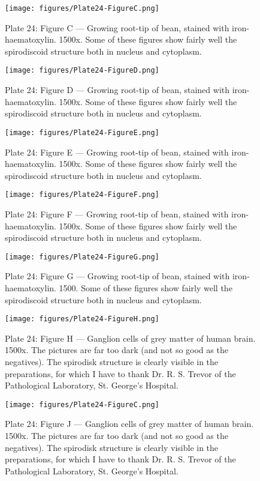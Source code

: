 \documentclass[a4paper, 12pt, oneside]{article}
\begin{document}
\clearpage
\begin{figure}[b]
\centering
\texttt{[image: figures/Plate24-FigureC.png]}
\caption{\small Plate 24: Figure C --- Growing root-tip of bean, stained with iron-haematoxylin. 1500x. Some of these figures show fairly well the spirodiscoid structure both in nucleus and cytoplasm.}
\end{figure}
\clearpage
\begin{figure}[b]
\centering
\texttt{[image: figures/Plate24-FigureD.png]}
\caption{\small Plate 24: Figure D --- Growing root-tip of bean, stained with iron-haematoxylin. 1500x. Some of these figures show fairly well the spirodiscoid structure both in nucleus and cytoplasm.}
\end{figure}
\clearpage
\begin{figure}[b]
\centering
\texttt{[image: figures/Plate24-FigureE.png]}
\caption{\small Plate 24: Figure E --- Growing root-tip of bean, stained with iron-haematoxylin. 1500x. Some of these figures show fairly well the spirodiscoid structure both in nucleus and cytoplasm.}
\end{figure}
\clearpage
\begin{figure}[b]
\centering
\texttt{[image: figures/Plate24-FigureF.png]}
\caption{\small Plate 24: Figure F --- Growing root-tip of bean, stained with iron-haematoxylin. 1500x. Some of these figures show fairly well the spirodiscoid structure both in nucleus and cytoplasm.}
\end{figure}
\clearpage
\begin{figure}[b]
\centering
\texttt{[image: figures/Plate24-FigureG.png]}
\caption{\small Plate 24: Figure G --- Growing root-tip of bean, stained with iron-haematoxylin. 1500. Some of these figures show fairly well the spirodiscoid structure both in nucleus and cytoplasm.}
\end{figure}
\clearpage
\begin{figure}[b]
\centering
\texttt{[image: figures/Plate24-FigureH.png]}
\caption{\small Plate 24: Figure H --- Ganglion cells of grey matter of human brain. 1500x. The pictures are far too dark (and not so good as the negatives). The spirodisk structure is clearly visible in the preparations, for which I have to thank Dr. R. S. Trevor of the Pathological Laboratory, St. George's Hospital.}
\end{figure}
\clearpage
\begin{figure}[H]
\centering
\texttt{[image: figures/Plate24-FigureC.png]}
\caption{\small Plate 24: Figure J --- Ganglion cells of grey matter of human brain. 1500x. The pictures are far too dark (and not so good as the negatives). The spirodisk structure is clearly visible in the preparations, for which I have to thank Dr. R. S. Trevor of the Pathological Laboratory, St. George's Hospital.}
\end{figure}
\end{document}
